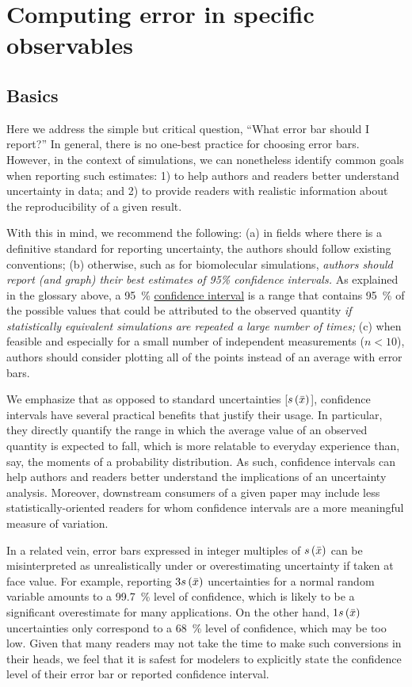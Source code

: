 \section{Computing error in specific observables}
\label{sec:specific}

\subsection{Basics}

Here we address the simple but critical question, ``What error bar should I report?''
In general, there is no one-best practice for choosing error bars. However, in the context of simulations, we can nonetheless identify common goals when reporting such estimates: 1) to help authors and readers better understand uncertainty in data; and 2) to provide readers with realistic information about the reproducibility of a given result.

With this in mind, we recommend the following: (a) in fields where there is a definitive standard for reporting uncertainty, the authors should follow existing conventions; (b) otherwise, such as for biomolecular simulations, \emph{authors should report (and graph) their best estimates of 95\% confidence intervals.} As explained in the glossary above, a 95~\% \hyperref[def:conf_int]{confidence interval} is a range that contains 95~\% of the possible values that could be attributed to the observed quantity \emph{if statistically equivalent simulations are repeated a large number of times;} (c) when feasible and especially for a small number of independent measurements ($n < 10$), authors should consider plotting all of the points instead of an average with error bars.

We emphasize that as opposed to standard uncertainties [$s\left( \bar{x} \right)$], confidence intervals have several practical benefits that justify their usage. In particular, they directly quantify the range in which the average value of an observed quantity is expected to fall, which is more relatable to everyday experience than, say, the moments of a probability distribution. As such, confidence intervals can help authors and readers better understand the implications of an uncertainty analysis. Moreover, downstream consumers of a given paper may include less statistically-oriented readers for whom confidence intervals are a more meaningful measure of variation.

In a related vein, error bars expressed in integer multiples of $s\left( \bar{x} \right)$ can be misinterpreted as unrealistically under or overestimating uncertainty if taken at face value. For example, reporting $3s\left( \bar{x} \right)$ uncertainties for a normal random variable amounts to a 99.7~\% level of confidence, which is likely to be a significant overestimate for many applications. On the other hand, $1s\left( \bar{x} \right)$ uncertainties only correspond to a 68~\% level of confidence, which may be too low. Given that many readers may not take the time to make such conversions in their heads, we feel that it is safest for modelers to explicitly state the confidence level of their error bar or reported confidence interval.

